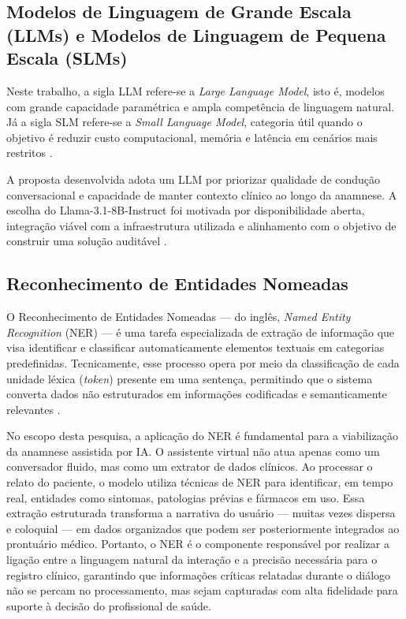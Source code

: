 \subsection{Modelos de Linguagem de Grande Escala (LLMs) e Modelos de Linguagem de Pequena Escala (SLMs)}
Neste trabalho, a sigla LLM refere-se a \textit{Large Language Model}, isto é, modelos com
grande capacidade paramétrica e ampla competência de linguagem natural. Já a sigla SLM
refere-se a \textit{Small Language Model}, categoria útil quando o objetivo é reduzir custo
computacional, memória e latência em cenários mais restritos \cite{llama3herd2024,metaai2024}.

A proposta desenvolvida adota um LLM por priorizar qualidade de condução
conversacional e capacidade de manter contexto clínico ao longo da anamnese. A escolha do
Llama-3.1-8B-Instruct foi motivada por disponibilidade aberta, integração viável com a
infraestrutura utilizada e alinhamento com o objetivo de construir uma solução auditável
\cite{llama3herd2024,huggingface2024,metaai2024}.

\subsection{Reconhecimento de Entidades Nomeadas}
O Reconhecimento de Entidades Nomeadas — do inglês, \textit{Named Entity Recognition} (NER) — 
é uma tarefa especializada de extração de informação que visa identificar e classificar 
automaticamente elementos textuais em categorias predefinidas. Tecnicamente, esse processo 
opera por meio da classificação de cada unidade léxica (\textit{token}) presente em uma sentença, 
permitindo que o sistema converta dados não estruturados em informações codificadas e 
semanticamente relevantes \cite{devlin2018,lee2020,sang2003}.

No escopo desta pesquisa, a aplicação do NER é fundamental para a viabilização da anamnese 
assistida por IA. O assistente virtual não atua apenas como um conversador fluido, mas como 
um extrator de dados clínicos. Ao processar o relato do paciente, o modelo utiliza técnicas 
de NER para identificar, em tempo real, entidades como sintomas, patologias prévias e 
fármacos em uso. Essa extração estruturada transforma a narrativa do usuário — muitas vezes 
dispersa e coloquial — em dados organizados que podem ser posteriormente integrados ao 
prontuário médico. Portanto, o NER é o componente responsável por realizar a ligação entre a 
linguagem natural da interação e a precisão necessária para o registro clínico, garantindo que 
informações críticas relatadas durante o diálogo não se percam no processamento, mas sejam 
capturadas com alta fidelidade para suporte à decisão do profissional de saúde.

